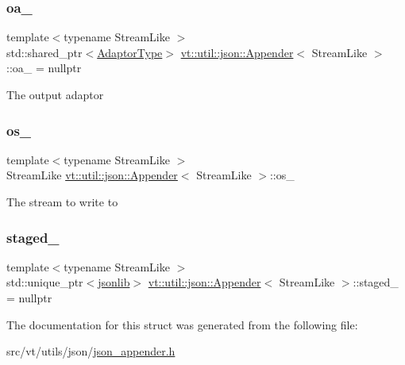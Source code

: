 \subsubsection{\texorpdfstring{oa\+\_\+}{oa\_}}
{\footnotesize\ttfamily template$<$typename Stream\+Like $>$ \\
std\+::shared\+\_\+ptr$<$\hyperlink{structvt_1_1util_1_1json_1_1_appender_ae7a25e7544d8529cb466651fff13db0b}{Adaptor\+Type}$>$ \hyperlink{structvt_1_1util_1_1json_1_1_appender}{vt\+::util\+::json\+::\+Appender}$<$ Stream\+Like $>$\+::oa\+\_\+ = nullptr\hspace{0.3cm}{\ttfamily [private]}}

The output adaptor \mbox{\label{structvt_1_1util_1_1json_1_1_appender_ab0078667ec1395e92014adc1aaa782e5}} 
\subsubsection{\texorpdfstring{os\+\_\+}{os\_}}
{\footnotesize\ttfamily template$<$typename Stream\+Like $>$ \\
Stream\+Like \hyperlink{structvt_1_1util_1_1json_1_1_appender}{vt\+::util\+::json\+::\+Appender}$<$ Stream\+Like $>$\+::os\+\_\+\hspace{0.3cm}{\ttfamily [private]}}

The stream to write to \mbox{\label{structvt_1_1util_1_1json_1_1_appender_a70d829fed542b8958636ba51a6ba2f89}} 
\subsubsection{\texorpdfstring{staged\+\_\+}{staged\_}}
{\footnotesize\ttfamily template$<$typename Stream\+Like $>$ \\
std\+::unique\+\_\+ptr$<$\hyperlink{structvt_1_1util_1_1json_1_1_appender_aa822e25e24db1cdea96f00b79f55f492}{jsonlib}$>$ \hyperlink{structvt_1_1util_1_1json_1_1_appender}{vt\+::util\+::json\+::\+Appender}$<$ Stream\+Like $>$\+::staged\+\_\+ = nullptr\hspace{0.3cm}{\ttfamily [private]}}



The documentation for this struct was generated from the following file\+:\begin{DoxyCompactItemize}
\item 
src/vt/utils/json/\hyperlink{json__appender_8h}{json\+\_\+appender.\+h}\end{DoxyCompactItemize}

